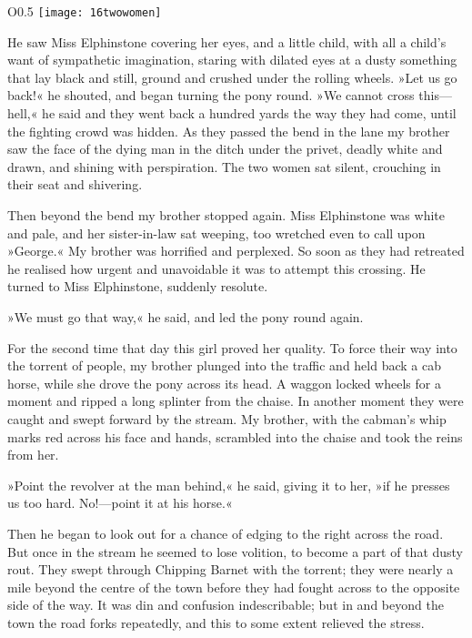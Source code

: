 \begin{wrapfigure}{O}{0.5\textwidth}
\centering
\texttt{[image: 16twowomen]}
\end{wrapfigure}

He saw Miss Elphinstone covering her eyes, and a little child, with all a child's want of sympathetic imagination, staring with dilated eyes at a dusty something that lay black and still, ground and crushed under the rolling wheels. »Let us go back!« he shouted, and began turning the pony round. »We cannot cross this—hell,« he said and they went back a hundred yards the way they had come, until the fighting crowd was hidden. As they passed the bend in the lane my brother saw the face of the dying man in the ditch under the privet, deadly white and drawn, and shining with perspiration. The two women sat silent, crouching in their seat and shivering.

Then beyond the bend my brother stopped again. Miss Elphinstone was white and pale, and her sister-in-law sat weeping, too wretched even to call upon »George.« My brother was horrified and perplexed. So soon as they had retreated he realised how urgent and unavoidable it was to attempt this crossing. He turned to Miss Elphinstone, suddenly resolute.

»We must go that way,« he said, and led the pony round again.

For the second time that day this girl proved her quality. To force their way into the torrent of people, my brother plunged into the traffic and held back a cab horse, while she drove the pony across its head. A waggon locked wheels for a moment and ripped a long splinter from the chaise. In another moment they were caught and swept forward by the stream. My brother, with the cabman's whip marks red across his face and hands, scrambled into the chaise and took the reins from her.

»Point the revolver at the man behind,« he said, giving it to her, »if he presses us too hard. No!—point it at his horse.«

Then he began to look out for a chance of edging to the right across the road. But once in the stream he seemed to lose volition, to become a part of that dusty rout. They swept through Chipping Barnet with the torrent; they were nearly a mile beyond the centre of the town before they had fought across to the opposite side of the way. It was din and confusion indescribable; but in and beyond the town the road forks repeatedly, and this to some extent relieved the stress.

